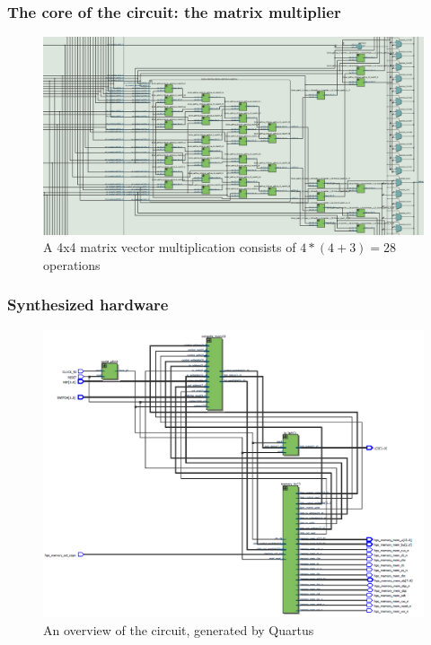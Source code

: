 \documentclass{beamer}[10]
\begin{document}
\begin{frame}
	\frametitle{The core of the circuit: the matrix multiplier}
	\begin{figure}
		\centering
		\includegraphics[width=\columnwidth]{figs/core.png}
		\caption{A 4x4 matrix vector multiplication consists of $4*(4+3) = 28$ operations}
	\end{figure}
\end{frame}
\begin{frame}
	\frametitle{Synthesized hardware}
	\begin{figure}
		\centering
		\includegraphics[width=.8\columnwidth]{figs/overview.png}
		\caption{An overview of the circuit, generated by Quartus}
	\end{figure}
\end{frame}
\end{document}

